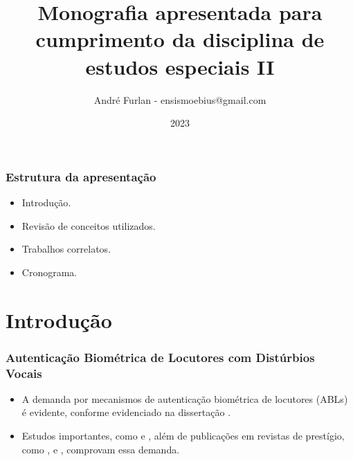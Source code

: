 \documentclass[aspectratio=169]{beamer}
\title{Monografia apresentada para cumprimento da disciplina de estudos especiais II}
\author{André Furlan - ensismoebius@gmail.com}
\institute{Universidade Estadual Paulista Júlio de Mesquita Filho}
\date{2023}
\begin{document}
	
	\frame{\titlepage}
	\begin{frame}
		\frametitle{Estrutura da apresentação}
		\begin{itemize}
			\item Introdução.
			\item Revisão de conceitos utilizados.
			\item Trabalhos correlatos.
			\item Cronograma.
		\end{itemize}
	\end{frame}
	
	\section{Introdução}
	
	\begin{frame}
		\frametitle{Autenticação Biométrica de Locutores com Distúrbios Vocais}
		\begin{itemize}
			\item A demanda por mecanismos de autenticação biométrica de locutores (ABLs) é evidente, conforme evidenciado na dissertação \cite{furlan2021caracterizacao}.
			\item Estudos importantes, como \cite{beigi2011speaker} e \cite{neustein2012forensic}, além de publicações em revistas de prestígio, como \cite{hansen2015speaker}, \cite{wang2022racp} e \cite{lee2020two}, comprovam essa demanda.
		\end{itemize}
	\end{frame}
	
\end{document}
